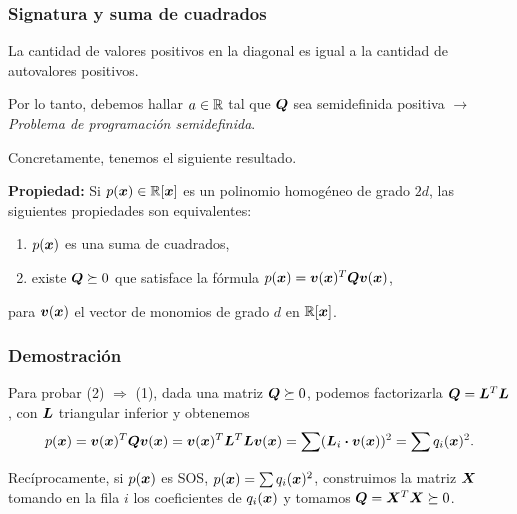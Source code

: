 \documentclass[aspectratio=169,12pt,spanish]{beamer}
\begin{document}

\begin{frame}

\frametitle{Signatura y suma de cuadrados}

\begin{block}{}
La cantidad de valores positivos en la diagonal es igual a la cantidad de autovalores positivos. 

Por lo tanto, debemos hallar $a \in \mathbb{R}$ tal que $\bm{Q}$ sea semidefinida positiva $\longrightarrow$ \emph{Problema de programaci\'on semidefinida}.
\end{block}

Concretamente, tenemos el siguiente resultado.

\textbf{Propiedad:} Si $p(\bm{x}) \in \mathbb{R}[\bm{x}]$ es un polinomio homogéneo de grado $2d$, las siguientes propiedades son equivalentes:
\begin{enumerate}
\item $p(\bm{x})$ es una suma de cuadrados,
\item existe $\bm{Q} \succeq 0$ que satisface la fórmula $p(\bm{x}) = \bm{v}(\bm{x})^T \bm{Q} \bm{v}(\bm{x})$,
\end{enumerate}
para $\bm{v}(\bm{x})$ el vector de monomios de grado $d$ en $\mathbb{R}[\bm{x}]$.

\end{frame}



\begin{frame}

\frametitle{Demostración}

Para probar (2) $\Rightarrow$ (1), dada una matriz $\bm{Q} \succeq 0$, podemos factorizarla $\bm{Q} = \bm{L}^T \bm{L}$, con $\bm{L}$ triangular inferior y obtenemos
$$
p(\bm{x}) = \bm{v}(\bm{x})^T \bm{Q} \bm{v}(\bm{x}) = \bm{v}(\bm{x})^T \bm{L}^T \bm{L} \bm{v}(\bm{x}) = \sum (\bm{L}_i \boldsymbol{\cdot} \bm{v}(\bm{x}))^2 = \sum q_i(\bm{x})^2.
$$

Recíprocamente, si $p(\bm{x})$ es SOS, $p(\bm{x}) = \sum q_i(\bm{x})^2$, construimos la matriz $\bm{X}$ tomando en la fila $i$ los coeficientes de $q_i(\bm{x})$ y tomamos $\bm{Q} = \bm{X}^T \bm{X} \succeq 0$.

\end{frame}


\end{document}
